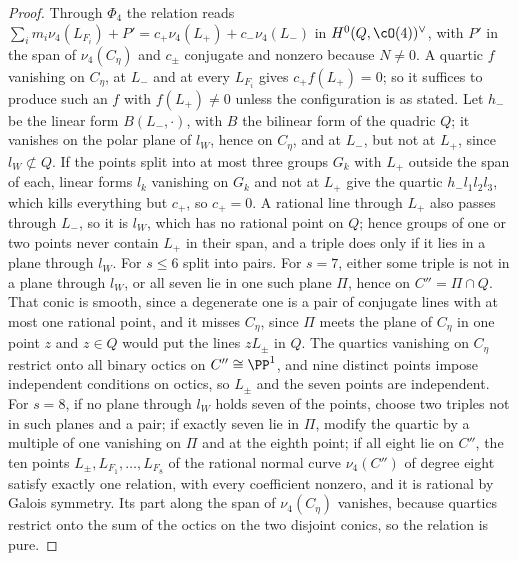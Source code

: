 \begin{proof}
Through $\Phi_{4}$ the relation reads
$\sum_{i}m_{i}\nu_{4}(L_{F_{i}})+P'=c_{+}\nu_{4}(L_{+})+c_{-}\nu_{4}(L_{-})$ in
$H^{0}(Q,\cO(4))^{\vee}$, with $P'$ in the span of $\nu_{4}(C_{\eta})$ and
$c_{\pm}$ conjugate and nonzero because $N\ne0$. A quartic $f$ vanishing on
$C_{\eta}$, at $L_{-}$ and at every $L_{F_{i}}$ gives $c_{+}f(L_{+})=0$; so it
suffices to produce such an $f$ with $f(L_{+})\ne0$ unless the configuration
is as stated. Let $h_{-}$ be the linear form $B(L_{-},\cdot)$, with $B$ the
bilinear form of the quadric $Q$; it vanishes on the polar plane of $l_{W}$,
hence on $C_{\eta}$, and at $L_{-}$, but not at $L_{+}$, since
$l_{W}\not\subset Q$. If the points split into at most three groups
$G_{k}$ with $L_{+}$ outside the span of each, linear forms $l_{k}$ vanishing
on $G_{k}$ and not at $L_{+}$ give the quartic $h_{-}l_{1}l_{2}l_{3}$, which
kills everything but $c_{+}$, so $c_{+}=0$. A rational line through $L_{+}$
also passes through $L_{-}$, so it is $l_{W}$, which has no rational point on
$Q$; hence groups of one or two points
never contain $L_{+}$ in their span, and a triple does only if it lies in a
plane through $l_{W}$. For $s\le6$ split into pairs. For $s=7$, either some
triple is not in a plane through $l_{W}$, or all seven lie in one such plane
$\Pi$, hence on $C''=\Pi\cap Q$. That conic is smooth, since a degenerate one
is a pair of conjugate lines with at most one rational point, and it misses
$C_{\eta}$, since $\Pi$ meets the plane of $C_{\eta}$ in one point $z$ and
$z\in Q$ would put the lines $zL_{\pm}$ in $Q$. The quartics vanishing on
$C_{\eta}$ restrict onto all binary octics on $C''\cong\PP^{1}$, and nine
distinct points impose independent conditions on octics, so $L_{\pm}$ and the
seven points are independent. For $s=8$, if no plane through $l_{W}$ holds
seven of the points, choose two triples not in such planes and a pair; if
exactly seven lie in $\Pi$, modify the quartic by a multiple of one vanishing
on $\Pi$ and at the eighth point; if all eight lie on $C''$, the ten points
$L_{\pm},L_{F_{1}},\dots,L_{F_{8}}$ of the rational normal curve
$\nu_{4}(C'')$ of degree eight satisfy exactly one relation, with every
coefficient nonzero, and it is rational by Galois symmetry. Its part along the
span of $\nu_{4}(C_{\eta})$ vanishes, because quartics restrict onto the sum of
the octics on the two disjoint conics, so the relation is pure.
\end{proof}

